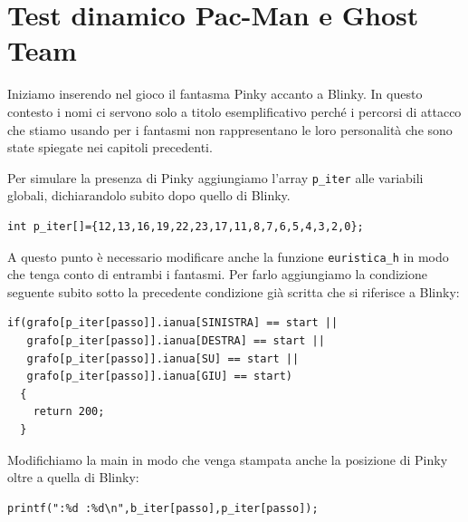 \documentclass[8pt]{book}
\begin{document}
\section{Test dinamico Pac-Man e Ghost Team}

Iniziamo inserendo nel gioco il fantasma Pinky accanto a Blinky. In questo contesto i nomi ci servono solo a titolo esemplificativo perché i percorsi di attacco che stiamo usando per i fantasmi non rappresentano le loro personalità che sono state spiegate nei capitoli precedenti.

Per simulare la presenza di Pinky aggiungiamo l'array \texttt{p\_iter} alle variabili globali, dichiarandolo subito dopo quello di Blinky.

\begin{spacing}{0.9}
  \begin{small}
    \begin{tcolorbox}
\begin{verbatim}
int p_iter[]={12,13,16,19,22,23,17,11,8,7,6,5,4,3,2,0};
\end{verbatim}
  \end{tcolorbox}
    \end{small}
      \end{spacing}

A questo punto è necessario modificare anche la funzione \texttt{euristica\_h} in modo che tenga conto di entrambi i fantasmi. Per farlo aggiungiamo la condizione seguente subito sotto la precedente condizione già scritta che si riferisce a Blinky:

\begin{spacing}{0.9}
  \begin{small}
    \begin{tcolorbox}
\begin{verbatim}
if(grafo[p_iter[passo]].ianua[SINISTRA] == start ||
   grafo[p_iter[passo]].ianua[DESTRA] == start ||
   grafo[p_iter[passo]].ianua[SU] == start ||
   grafo[p_iter[passo]].ianua[GIU] == start)
  {
    return 200;
  }
\end{verbatim}
  \end{tcolorbox}
    \end{small}
      \end{spacing}

Modifichiamo la main in modo che venga stampata anche la posizione di Pinky oltre a quella di Blinky:

\begin{spacing}{0.9}
  \begin{small}
    \begin{tcolorbox}
\begin{verbatim}
printf(":%d :%d\n",b_iter[passo],p_iter[passo]);
\end{verbatim}
  \end{tcolorbox}
    \end{small}
      \end{spacing}
\end{document}
